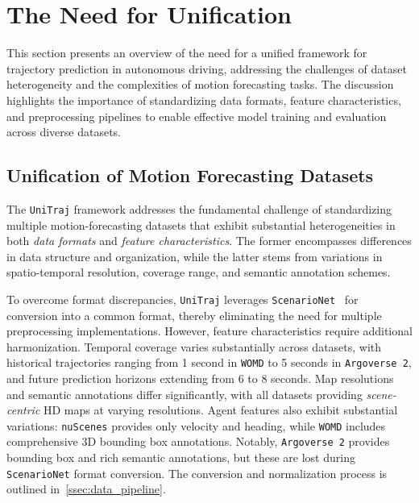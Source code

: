 \section{The Need for Unification}
\label{ch:unitraj}

This section presents an overview of the need for a unified framework for trajectory prediction in autonomous driving, addressing the challenges of dataset heterogeneity and the complexities of motion forecasting tasks. The discussion highlights the importance of standardizing data formats, feature characteristics, and preprocessing pipelines to enable effective model training and evaluation across diverse datasets.

\subsection{Unification of Motion Forecasting Datasets}
\label{sec:data_datasets}

The \texttt{UniTraj} framework addresses the fundamental challenge of standardizing multiple motion-forecasting datasets that exhibit substantial heterogeneities in both \emph{data formats} and \emph{feature characteristics}.
The former encompasses differences in data structure and organization, while the latter stems from variations in
spatio-temporal resolution, coverage range, and semantic annotation schemes.

To overcome format discrepancies, \texttt{UniTraj} leverages \texttt{ScenarioNet}~\cite{scenarionetLi2023} for conversion into a common
format, thereby eliminating the need for multiple preprocessing implementations. However, feature characteristics require additional harmonization. Temporal coverage varies substantially
across datasets, with historical trajectories ranging from 1 second in \texttt{WOMD}\cite{wmodSun2020} to 5 seconds in \texttt{Argoverse 2}\cite{av2Wilson2023},
and future prediction horizons extending from 6 to 8 seconds. Map resolutions and semantic annotations differ
significantly, with all datasets providing \emph{scene-centric} HD maps at varying resolutions.
Agent features also exhibit substantial variations: \texttt{nuScenes} provides only velocity and heading, while
\texttt{WOMD} includes comprehensive 3D bounding box annotations. Notably, \texttt{Argoverse 2} provides bounding
box and rich semantic annotations, but these are lost during \texttt{ScenarioNet} format conversion.
The conversion and normalization process is outlined in~\autoref{ssec:data_pipeline}.

